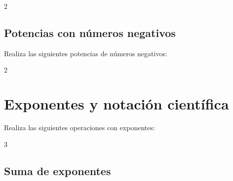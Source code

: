 \documentclass[12pt,examen,answers]{repaso_layout}
\begin{document}
\begin{questions}
\begin{multicols}{2}
\begin{parts}
            \end{parts}
      \end{multicols}

      
	\subsection{Potencias con números negativos}

      \question[4] Realiza las siguientes potencias de números negativos:
     
      \begin{multicols}{2}
      \end{multicols}


	\section{Exponentes y notación científica}

      \question[6] Realiza las siguientes operaciones con exponentes:
   
      \begin{multicols}{3}
            \begin{parts}
                  
	\subsection{Suma de exponentes}


\end{parts}
\end{multicols}
\end{questions}
\end{document}
